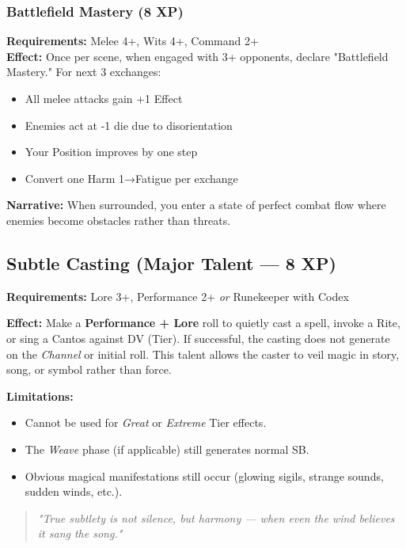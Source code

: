 \subsubsection{Battlefield Mastery (8 XP)}
\textbf{Requirements:} Melee 4+, Wits 4+, Command 2+ \\
\textbf{Effect:} Once per scene, when engaged with 3+ opponents, declare "Battlefield Mastery." For next 3 exchanges:
\begin{itemize}
    \item All melee attacks gain +1 Effect
    \item Enemies act at -1 die due to disorientation
    \item Your Position improves by one step
    \item Convert one Harm 1→Fatigue per exchange
\end{itemize}
\textbf{Narrative:} When surrounded, you enter a state of perfect combat flow where enemies become obstacles rather than threats.

\subsection*{Subtle Casting (Major Talent --- 8 XP)}

\textbf{Requirements:} Lore 3+, Performance 2+ \emph{or} Runekeeper with Codex

\textbf{Effect:} Make a \textbf{Performance + Lore} roll to quietly cast a spell, invoke a Rite, or sing a Cantos against DV (Tier). 
If successful, the casting does not generate  on the \emph{Channel} or initial roll. 
This talent allows the caster to veil magic in story, song, or symbol rather than force.

\textbf{Limitations:}
\begin{itemize}
  \item Cannot be used for \emph{Great} or \emph{Extreme} Tier effects.
  \item The \emph{Weave} phase (if applicable) still generates normal SB.
  \item Obvious magical manifestations still occur (glowing sigils, strange sounds, sudden winds, etc.).
\end{itemize}

\begin{quote}
\emph{"True subtlety is not silence, but harmony --- when even the wind believes it sang the song."}
\end{quote}


